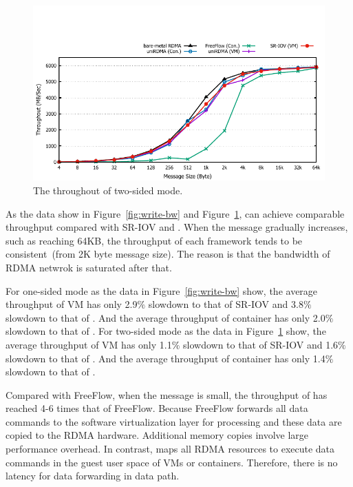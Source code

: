 \begin{figure}[!ht]
	\centering
	\includegraphics[width=1.0\linewidth]{images/send-bw.pdf}
	\caption{The throughout of two-sided mode.}
	\label{fig:send-bw}
\end{figure}


As the data show in Figure~\ref{fig:write-bw} and Figure~\ref{fig:send-bw}, \sys can achieve comparable throughput compared with SR-IOV and \native. When the message gradually increases, such as reaching 64KB, the throughput of each framework tends to be consistent~(from 2K byte message size). The reason is that the bandwidth of RDMA netwrok is saturated after that. %

For one-sided mode as the data in Figure~\ref{fig:write-bw} show, the average throughput of \sys VM has only 2.9$\%$ slowdown to that of SR-IOV and 3.8$\%$ slowdown to that of \native. And the average throughput of \sys container has only 2.0$\%$ slowdown to that of \native. For two-sided mode as the data in Figure~\ref{fig:send-bw} show, the average throughput of \sys VM has only 1.1$\%$ slowdown to that of SR-IOV and 1.6$\%$ slowdown to that of \native. And the average throughput of \sys container has only 1.4$\%$ slowdown to that of \native.




Compared with FreeFlow, when the message is small, the throughput of \sys has reached 4-6 times that of FreeFlow. Because FreeFlow forwards all data commands to the software virtualization layer for processing and these data are copied to the RDMA hardware. Additional memory copies involve large performance overhead. In contrast, \sys maps all RDMA resources to execute data commands in the guest user space of VMs or containers. Therefore, there is no latency for data forwarding in data path.





